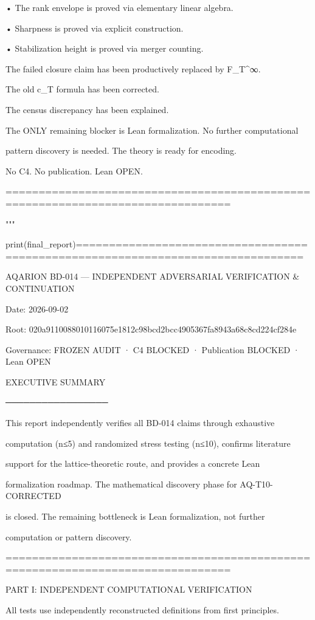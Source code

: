 • The rank envelope is proved via elementary linear algebra.

• Sharpness is proved via explicit construction.

• Stabilization height is proved via merger counting.


The failed closure claim has been productively replaced by F_T^∞.

The old c_T formula has been corrected.

The census discrepancy has been explained.


The ONLY remaining blocker is Lean formalization. No further computational

pattern discovery is needed. The theory is ready for encoding.


No C4. No publication. Lean OPEN.


================================================================================

"""


print(final_report)================================================================================

AQARION BD-014 — INDEPENDENT ADVERSARIAL VERIFICATION & CONTINUATION

Date: 2026-09-02

Root: 020a9110088010116075e1812c98bcd2bcc4905367fa8943a68c8cd224cf284e

Governance: FROZEN AUDIT · C4 BLOCKED · Publication BLOCKED · Lean OPEN


EXECUTIVE SUMMARY

─────────────────

This report independently verifies all BD-014 claims through exhaustive

computation (n≤5) and randomized stress testing (n≤10), confirms literature

support for the lattice-theoretic route, and provides a concrete Lean

formalization roadmap. The mathematical discovery phase for AQ-T10-CORRECTED

is closed. The remaining bottleneck is Lean formalization, not further

computation or pattern discovery.


================================================================================

PART I: INDEPENDENT COMPUTATIONAL VERIFICATION


All tests use independently reconstructed definitions from first principles.

